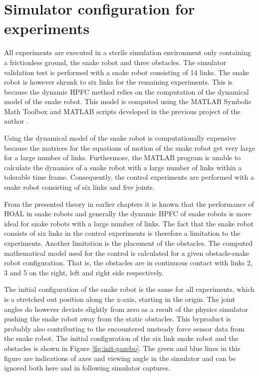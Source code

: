 \section{Simulator configuration for experiments}\label{sec:sim-config-exp}

All experiments are executed in a sterile simulation environment only containing a frictionless ground, the snake robot and three obstacles. The simulator validation test is performed with a snake robot consisting of 14 links. The snake robot is however shrunk to six links for the remaining experiments. This is because the dynamic HPFC method relies on the computation of the dynamical model of the snake robot. This model is computed using the MATLAB Symbolic Math Toolbox \cite{matlabsymbolic} and MATLAB scripts developed in the previous project of the author \cite{AtussaProsjektoppgp}.

Using the dynamical model of the snake robot is computationally expensive because the matrices for the equations of motion of the snake robot get very large for a large number of links. Furthermore, the MATLAB program is unable to calculate the dynamics of a snake robot with a large number of links within a tolerable time frame. Consequently, the control experiments are performed with a snake robot consisting of six links and five joints.

From the presented theory in earlier chapters it is known that the performance of HOAL in snake robots and generally the dynamic HPFC of snake robots is more ideal for snake robots with a large number of links. The fact that the snake robot consists of six links in the control experiments is therefore a limitation to the experiments. Another limitation is the placement of the obstacles. The computed mathematical model used for the control is calculated for a given obstacle-snake robot configuration. That is, the obstacles are in continuous contact with links 2, 3 and 5 on the right, left and right side respectively.

The initial configuration of the snake robot is the same for all experiments, which is a stretched out position along the x-axis, starting in the origin. The joint angles do however deviate slightly from zero as a result of the physics simulator pushing the snake robot away from the static obstacles. This byproduct is probably also contributing to the encountered unsteady force sensor data from the snake robot. The initial configuration of the six link snake robot and the obstacles is shown in Figure \ref{fig:init-gazebo}. The green and blue lines in this figure are indications of axes and viewing angle in the simulator and can be ignored both here and in following simulator captures.

